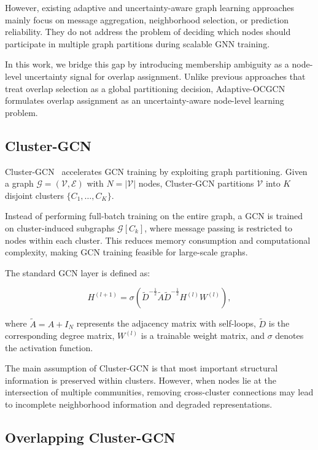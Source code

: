 \documentclass[pdflatex,sn-mathphys-num]{sn-jnl}%
\theoremstyle{thmstyleone}%
\theoremstyle{thmstyletwo}%
\theoremstyle{thmstylethree}%
\begin{document}
However, existing adaptive and uncertainty-aware graph learning approaches mainly focus on message aggregation, neighborhood selection, or prediction reliability.
They do not address the problem of deciding which nodes should participate in multiple graph partitions during scalable GNN training.

In this work, we bridge this gap by introducing membership ambiguity as a node-level uncertainty signal for overlap assignment.
Unlike previous approaches that treat overlap selection as a global partitioning decision, Adaptive-OCGCN formulates overlap assignment as an uncertainty-aware node-level learning problem.

\subsection{Cluster-GCN}
\label{subsec:clustergcn}

Cluster-GCN~\citep{Cluster-GCN} accelerates GCN training by exploiting graph partitioning.
Given a graph $\mathcal{G}=(\mathcal{V},\mathcal{E})$ with $N=|\mathcal{V}|$ nodes, Cluster-GCN partitions $\mathcal{V}$ into $K$ disjoint clusters $\{C_1,\ldots,C_K\}$.

Instead of performing full-batch training on the entire graph, a GCN is trained on cluster-induced subgraphs $\mathcal{G}[C_k]$, where message passing is restricted to nodes within each cluster.
This reduces memory consumption and computational complexity, making GCN training feasible for large-scale graphs.

The standard GCN layer is defined as:

\begin{equation}
H^{(l+1)}
=
\sigma
\left(
\tilde{D}^{-\frac{1}{2}}
\tilde{A}
\tilde{D}^{-\frac{1}{2}}
H^{(l)}
W^{(l)}
\right),
\label{eq:gcn-layer}
\end{equation}

where $\tilde{A}=A+I_N$ represents the adjacency matrix with self-loops, $\tilde{D}$ is the corresponding degree matrix, $W^{(l)}$ is a trainable weight matrix, and $\sigma$ denotes the activation function.

The main assumption of Cluster-GCN is that most important structural information is preserved within clusters.
However, when nodes lie at the intersection of multiple communities, removing cross-cluster connections may lead to incomplete neighborhood information and degraded representations.

\subsection{Overlapping Cluster-GCN}
\label{subsec:ocgcn}
\end{document}
